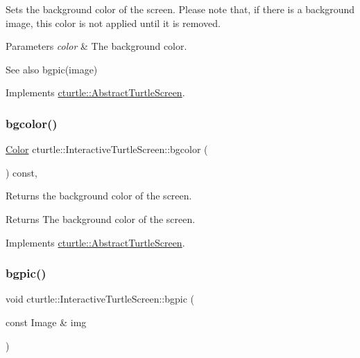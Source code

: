 Sets the background color of the screen. Please note that, if there is a background image, this color is not applied until it is removed. 
\begin{DoxyParams}{Parameters}
{\em color} & The background color. \\
\hline
\end{DoxyParams}
\begin{DoxySeeAlso}{See also}
bgpic(image) 
\end{DoxySeeAlso}


Implements \hyperlink{classcturtle_1_1AbstractTurtleScreen}{cturtle\+::\+Abstract\+Turtle\+Screen}.

\mbox{\label{classcturtle_1_1InteractiveTurtleScreen_a55289593218ba99904f7957700ef7dae}} 
\subsubsection{\texorpdfstring{bgcolor()}{bgcolor()}\hspace{0.1cm}{\footnotesize\ttfamily [2/2]}}
{\footnotesize\ttfamily \hyperlink{classcturtle_1_1Color}{Color} cturtle\+::\+Interactive\+Turtle\+Screen\+::bgcolor (\begin{DoxyParamCaption}{ }\end{DoxyParamCaption}) const\hspace{0.3cm}{\ttfamily [inline]}, {\ttfamily [virtual]}}

Returns the background color of the screen. \begin{DoxyReturn}{Returns}
The background color of the screen. 
\end{DoxyReturn}


Implements \hyperlink{classcturtle_1_1AbstractTurtleScreen}{cturtle\+::\+Abstract\+Turtle\+Screen}.

\mbox{\label{classcturtle_1_1InteractiveTurtleScreen_af681fbd6140ea760204fa9a1766725e3}} 
\subsubsection{\texorpdfstring{bgpic()}{bgpic()}\hspace{0.1cm}{\footnotesize\ttfamily [1/2]}}
{\footnotesize\ttfamily void cturtle\+::\+Interactive\+Turtle\+Screen\+::bgpic (\begin{DoxyParamCaption}\item[{const Image \&}]{img }\end{DoxyParamCaption})\hspace{0.3cm}{\ttfamily [inline]}}



